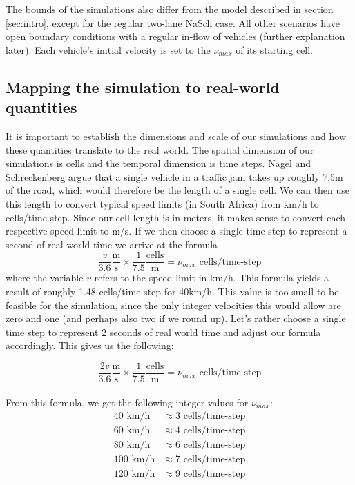 \documentclass[11pt]{article}
\begin{document}
	The bounds of the simulations also differ from the model described in section \ref{sec:intro}, except for the regular two-lane NaSch case. All other scenarios have open boundary conditions with a regular in-flow of vehicles (further explanation later). Each vehicle's initial velocity is set to the $\nu_{max}$ of its starting cell. \\
	
	\subsection{Mapping the simulation to real-world quantities}\label{subsec:quantmap}
	
	It is important to establish the dimensions and scale of our simulations and how these quantities translate to the real world. The spatial dimension of our simulations is cells and the temporal dimension is time steps. Nagel and Schreckenberg argue that a single vehicle in a traffic jam takes up roughly 7.5m of the road, which would therefore be the length of a single cell. We can then use this length to convert typical speed limits (in South Africa) from km/h to cells/time-step. Since our cell length is in meters, it makes sense to convert each respective speed limit to m/s. If we then choose a single time step to represent a second of real world time we arrive at the formula
	\[ \frac{v}{3.6} \frac{\text{m}}{\text{s}} \times \frac{1}{7.5} \frac{\text{cells}}{\text{m}} = \nu_{max} \text{ cells/time-step} \]
	where the variable $v$ refers to the speed limit in km/h. 
	This formula yields a result of roughly 1.48 cells/time-step for 40km/h. This value is too small to be feasible for the simulation, since the only integer velocities this would allow are zero and one (and perhaps also two if we round up). Let's rather choose a single time step to represent 2 seconds of real world time and adjust our formula accordingly. This gives us the following:
	
	\[ \frac{2v}{3.6} \frac{\text{m}}{\text{s}} \times \frac{1}{7.5} \frac{\text{cells}}{\text{m}} = \nu_{max} \text{ cells/time-step} \] \\
	
	From this formula, we get the following integer values for $\nu_{max}$:
	\begin{align*}
		40 \text{ km/h} &\approx 3 \text{ cells/time-step} \\
		60 \text{ km/h} &\approx 4 \text{ cells/time-step} \\
		80 \text{ km/h} &\approx 6 \text{ cells/time-step} \\
		100 \text{ km/h} &\approx 7 \text{ cells/time-step} \\
		120 \text{ km/h} &\approx 9 \text{ cells/time-step} \\
	\end{align*}
\end{document}
